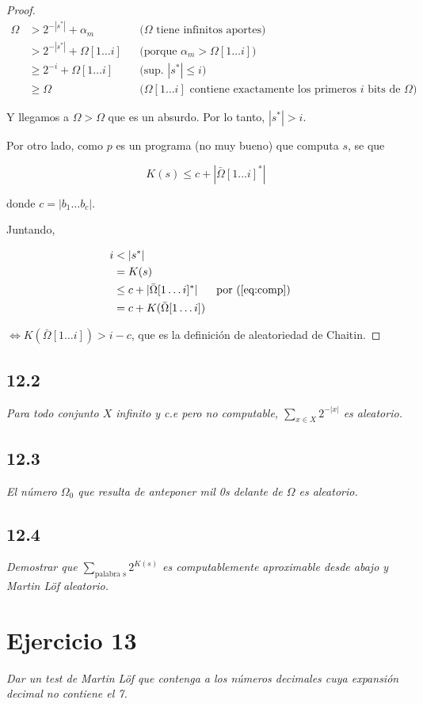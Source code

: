 \documentclass{article}
\theoremstyle{definition} %
\newcommand{\first}[2]{#2[1 \dots #1]}
\begin{document}
\begin{proof}
    \begin{align*}
        \Omega 
        &> 2^{-|s^*|} + \alpha_m
            &&\text{($\Omega$ tiene infinitos aportes)}\\
        &> 2^{-|s^*|} + \first{i}{\Omega}
            &&\text{(porque $\alpha_m > \first{i}{\Omega}$)}\\
        &\geq 2^{-i} + \first{i}{\Omega}
            &&\text{(sup. $|s^*| \leq i$)}\\
        &\geq \Omega
            &&\text{($\first{i}{\Omega}$ contiene exactamente los primeros $i$ bits de $\Omega$)}
    \end{align*}

    Y llegamos a $\Omega > \Omega$ que es un absurdo. Por lo tanto, $|s^*| > i$.
    
    Por otro lado, como $p$ es un programa (no muy bueno) que computa $s$, se que

    \begin{equation}\label{eq:comp}
         K(s) \leq c + |\first{i}{\bar{\Omega}}^*|
    \end{equation}

    donde $c = |b_1 \dots b_c|$.

    Juntando,

    \begin{align*}
        i
            &< |s^*|\\
            &= K(s)\\
            &\leq c + |\first{i}{\bar{\Omega}}^*| &&\text{por (\ref{eq:comp})}\\
            &= c + K(\first{i}{\bar{\Omega}})
    \end{align*}

    $\iff K(\first{i}{\bar{\Omega}}) > i - c$, que es la definición de
    aleatoriedad de Chaitin.

\end{proof}

\subsection*{12.2}

\textit{Para todo conjunto $X$ infinito y c.e pero no computable, $\sum_{x \in
X} 2^{-|x|}$ es aleatorio.}

\subsection*{12.3}

\textit{El número $\Omega_0$ que resulta de anteponer mil 0s delante de $\Omega$ es aleatorio.}

\subsection*{12.4}

\textit{Demostrar que $\sum_{\text{palabra s}} 2^{K(s)}$ es computablemente
aproximable desde abajo y Martin Löf aleatorio.}

\section*{Ejercicio 13}

\textit{Dar un test de Martin Löf que contenga a los números decimales cuya expansión decimal no contiene el 7.}
\end{document}
